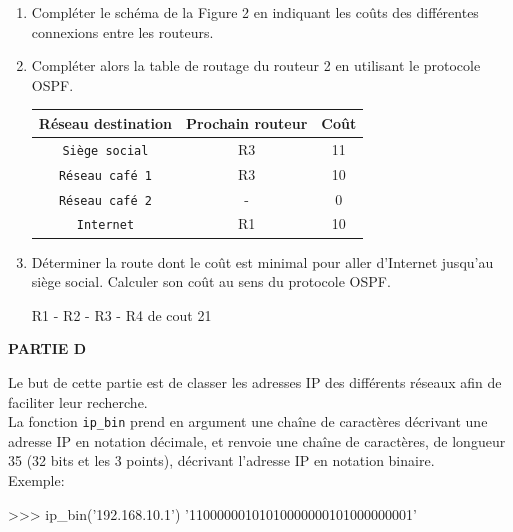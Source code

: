 \documentclass[11pt, a4paper]{report}
\renewcommand{\arraystretch}{1}  %
\begin{document}
\begin{enumerate}[resume]
    \item Compléter le schéma de la Figure 2 en indiquant les coûts des différentes connexions entre les routeurs.
    \item Compléter alors la table de routage du routeur 2 en utilisant le protocole OSPF.
\renewcommand{\arraystretch}{1.5}
\begin{center}
    \begin{tabular}{|c|c|c|}
        \hline
        \textbf{Réseau destination}  & \textbf{Prochain routeur} & \textbf{Coût}\\ \hline
        \verb|Siège social| & R3 &  11\\ \hline
        \verb|Réseau café 1| & R3&  10\\ \hline
        \verb|Réseau café 2| &  - &  0\\ \hline
        \verb|Internet| & R1& 10 \\ \hline
   
        \hline
    \end{tabular}
\end{center}

\item Déterminer la route dont le coût est minimal pour aller d'Internet jusqu'au siège social. Calculer son coût au sens du protocole OSPF.


            \begin{blocvisible}[height=3]
                R1 - R2 - R3 - R4 de cout 21
    \end{blocvisible}

    \end{enumerate}


    \textbf{PARTIE D}

    \medskip

    Le but de cette partie est de classer les adresses IP des différents réseaux afin de faciliter leur recherche.\\

La fonction \verb|ip_bin| prend en argument une chaîne de caractères décrivant une adresse IP en notation décimale, et renvoie une chaîne de caractères, de longueur 35 (32 bits et les 3 points), décrivant l'adresse IP en notation binaire.\\

Exemple:

\begin{CodePythontexAlt}[TaillePolice=\large, Largeur=1\linewidth,Centre,Lignes=true,PremLigne=1]{}
	>>> ip_bin('192.168.10.1') 
    '11000000101010000000101000000001'

	\end{CodePythontexAlt}
\end{document}
